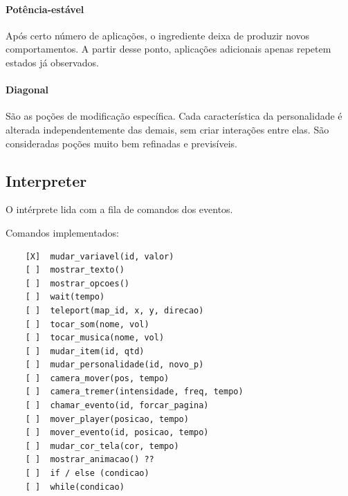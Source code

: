\documentclass[12pt]{article}
\begin{document}
\paragraph{Potência-estável}
Após certo número de aplicações, o ingrediente deixa de produzir novos comportamentos. A partir desse ponto, aplicações adicionais apenas repetem estados já observados.

\paragraph{Diagonal}
São as poções de modificação específica. Cada característica da personalidade é alterada independentemente das demais, sem criar interações entre elas. São consideradas poções muito bem refinadas e previsíveis.



\subsection{Interpreter}

O intérprete lida com a fila de comandos dos eventos.

Comandos implementados:

\begin{verbatim}
    [X]  mudar_variavel(id, valor)
    [ ]  mostrar_texto()
    [ ]  mostrar_opcoes()
    [ ]  wait(tempo)
    [ ]  teleport(map_id, x, y, direcao)
    [ ]  tocar_som(nome, vol)
    [ ]  tocar_musica(nome, vol)
    [ ]  mudar_item(id, qtd)
    [ ]  mudar_personalidade(id, novo_p)
    [ ]  camera_mover(pos, tempo)
    [ ]  camera_tremer(intensidade, freq, tempo)
    [ ]  chamar_evento(id, forcar_pagina) 
    [ ]  mover_player(posicao, tempo)
    [ ]  mover_evento(id, posicao, tempo)
    [ ]  mudar_cor_tela(cor, tempo)
    [ ]  mostrar_animacao() ??
    [ ]  if / else (condicao)
    [ ]  while(condicao)
\end{verbatim}

\newpage
\end{document}
